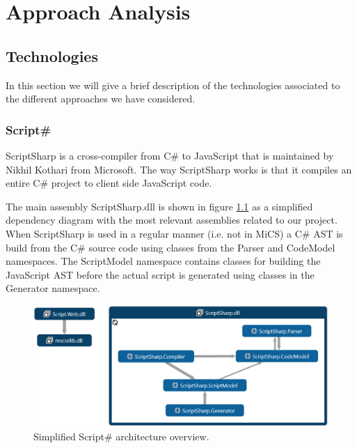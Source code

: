 \chapter{Approach Analysis}

\section{Technologies}
	In this section we will give a brief description of the technologies associated to the different approaches we have considered.

	\subsection{Script\#} %
	\label{sub:subsection_name}
		ScriptSharp \cite{scriptsharp} is a cross-compiler from C\# to JavaScript that is maintained by Nikhil Kothari \cite{nikhilk} from Microsoft. The way ScriptSharp works is that it compiles an entire C\# project to client side JavaScript code.

		The main assembly ScriptSharp.dll is shown in figure \ref{simplifiedOverview} as a simplified dependency diagram with the most relevant assemblies related to our project. When ScriptSharp is used in a regular manner (i.e. not in MiCS) a C\# AST is build from the C\# source code using classes from the Parser and CodeModel namespaces. The ScriptModel namespace contains classes for building the JavaScript AST before the actual script is generated using classes in the Generator namespace.

				\begin{figure}[H]
			\begin{center}
				\centerline{\includegraphics[width=14cm]{resources/images/SimplifiedOverview.png}}
			\end{center}
			\caption{Simplified Script\# architecture overview.}
			\label{simplifiedOverview}
		\end{figure}

